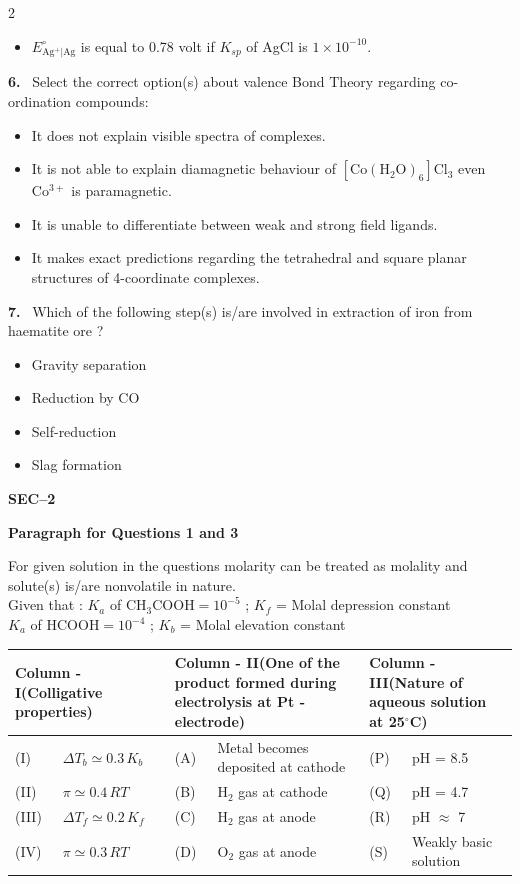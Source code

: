 \documentclass[10pt]{extarticle}
\newcommand{\sect}[1]{\par\smallskip\noindent\textbf{#1}\par}
\newcommand{\qn}[1]{\par\smallskip\noindent\textbf{#1.}~}
\newcommand{\paraq}[2]{\par\smallskip\noindent\textbf{Paragraph for Questions #1 and #2}\par}
\newenvironment{qoptions}{\begin{itemize}[leftmargin=1.8em,itemsep=1pt,topsep=2pt,label={}]}{\end{itemize}}
\newcommand{\opt}[2]{\item[(#1)] #2}
\begin{document}
\begin{multicols}{2}
\begin{qoptions}
\opt{D}{$E^\circ_{\mathrm{Ag^+|Ag}}$ is equal to 0.78 volt if $K_{sp}$ of AgCl is $1\times10^{-10}$.}
\end{qoptions}
\qn{6} Select the correct option(s) about valence Bond Theory regarding co-ordination compounds:
\begin{qoptions}
\opt{A}{It does not explain visible spectra of complexes.}
\opt{B}{It is not able to explain diamagnetic behaviour of $\mathrm{[Co(H_2O)_6]Cl_3}$ even $\mathrm{Co^{3+}}$ is paramagnetic.}
\opt{C}{It is unable to differentiate between weak and strong field ligands.}
\opt{D}{It makes exact predictions regarding the tetrahedral and square planar structures of 4-coordinate complexes.}
\end{qoptions}
\qn{7} Which of the following step(s) is/are involved in extraction of iron from haematite ore ?
\begin{qoptions}
\opt{A}{Gravity separation}
\opt{B}{Reduction by CO}
\opt{C}{Self-reduction}
\opt{D}{Slag formation}
\end{qoptions}
\sect{SEC--2}
\paraq{1}{3}
For given solution in the questions molarity can be treated as molality and solute(s) is/are nonvolatile in nature.\\
Given that : $K_a$ of $\mathrm{CH_3COOH}=10^{-5}$ \quad ; \quad $K_f$ = Molal depression constant\\
\hspace*{3.4em}$K_a$ of $\mathrm{HCOOH}=10^{-4}$ \quad ; \quad $K_b$ = Molal elevation constant
\end{multicols}
\begin{center}\small\setlength{\tabcolsep}{4pt}
\begin{tabular}{|p{0.9cm}|p{3.4cm}|p{0.9cm}|p{5.2cm}|p{0.9cm}|p{3.8cm}|}\hline
\multicolumn{2}{|p{\dimexpr 4.3cm+2\tabcolsep\relax}|}{\centering \textbf{Column - I}\newline\textbf{(Colligative properties)}} & \multicolumn{2}{p{\dimexpr 6.1cm+2\tabcolsep\relax}|}{\centering \textbf{Column - II}\newline\textbf{(One of the product formed during electrolysis at Pt - electrode)}} & \multicolumn{2}{p{\dimexpr 4.7cm+2\tabcolsep\relax}|}{\centering \textbf{Column - III}\newline\textbf{(Nature of aqueous solution at 25$^\circ$C)}}\\\hline
(I) & $\Delta T_b\simeq0.3\,K_b$ & (A) & Metal becomes deposited at cathode & (P) & pH = 8.5\\\hline
(II) & $\pi\simeq0.4\,RT$ & (B) & $\mathrm{H_2}$ gas at cathode & (Q) & pH = 4.7\\\hline
(III) & $\Delta T_f\simeq0.2\,K_f$ & (C) & $\mathrm{H_2}$ gas at anode & (R) & pH $\approx$ 7\\\hline
(IV) & $\pi\simeq0.3\,RT$ & (D) & $\mathrm{O_2}$ gas at anode & (S) & Weakly basic solution\\\hline
\end{tabular}
\end{center}
\end{document}
